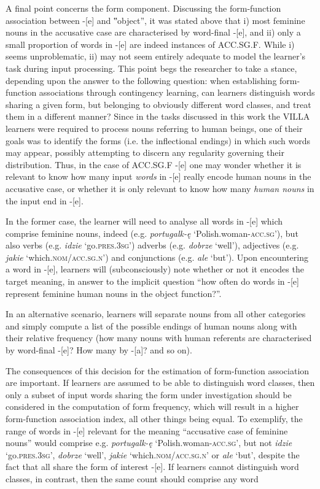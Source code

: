 A final point concerns the form component. Discussing the form-func\-tion association between -[e] and ‟object”, it was stated above that i) most feminine nouns in the accusative case are characterised by word-final -[e], and ii) only a small proportion of words in -[e] are indeed instances of ACC.SG.F. While i) seems unproblematic, ii) may not seem entirely adequate to model the learner’s task during input processing. This point begs the researcher to take a stance, depending upon the answer to the following question: when establishing form-func\-tion associations through contingency learning, can learners distinguish words sharing a given form, but belonging to obviously different word classes, and treat them in a different manner? Since in the tasks discussed in this work the VILLA learners were required to process nouns referring to human beings, one of their goals was to identify the forms (i.e. the inflectional endings) in which such words may appear, possibly attempting to discern any regularity governing their distribution. Thus, in the case of ACC.SG.F -[e] one may wonder whether it is relevant to know how many input \textit{words} in -[e] really encode human nouns in the accusative case, or whether it is only relevant to know how many \textit{human nouns} in the input end in -[e].

In the former case, the learner will need to analyse all words in -[e] which comprise feminine nouns, indeed (e.g. \textit{portugalk-ę} ‘Polish.woman-\textsc{acc.sg’}), but also verbs (e.g. \textit{idzie} ‘go.\textsc{pres.3sg’}) adverbs (e.g. \textit{dobrze} ‘well’), adjectives (e.g. \textit{jakie} ‘which.\textsc{nom/acc.sg.n}’) and conjunctions (e.g. \textit{ale} ‘but’). Upon encountering a word in -[e], learners will (subconsciously) note whether or not it encodes the target meaning, in answer to the implicit question “how often do words in -[e] represent feminine human nouns in the object function?”.

In an alternative scenario, learners will separate nouns from all other categories and simply compute a list of the possible endings of human nouns along with their relative frequency (how many nouns with human referents are characterised by word-final -[e]? How many by -[a]? and so on).

The consequences of this decision for the estimation of form-func\-tion association are important. If learners are assumed to be able to distinguish word classes, then only a subset of input words sharing the form under investigation should be considered in the computation of form frequency, which will result in a higher form-func\-tion association index, all other things being equal. To exemplify, the range of words in -[e] relevant for the meaning “accusative case of feminine nouns” would comprise e.g. \textit{portugalk-ę} ‘Polish.woman-\textsc{acc.sg’}, but not \textit{idzie} ‘go.\textsc{pres.3sg}’, \textit{dobrze} ‘well’, \textit{jakie} ‘which.\textsc{nom/acc.sg.n}’ or \textit{ale} ‘but’, despite the fact that all share the form of interest -[e]. If learners cannot distinguish word classes, in contrast, then the same count should comprise any word

